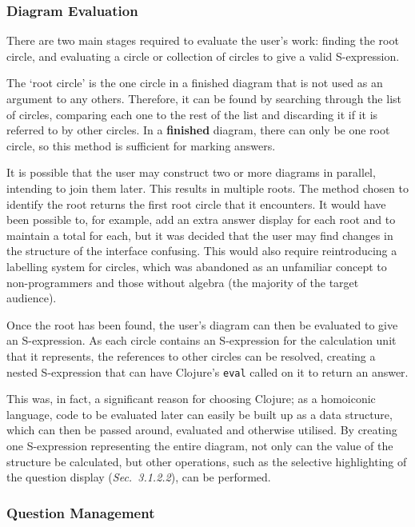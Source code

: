 \documentclass[12pt,twoside,notitlepage,xetex]{report}
\begin{document}
\subsubsection{Diagram Evaluation}

There are two main stages required to evaluate the user's work: finding the root circle, and evaluating a circle or collection of circles to give a valid S-expression.

The `root circle' is the one circle in a finished diagram that is not used as an argument to any others.  Therefore, it can be found by searching through the list of circles, comparing each one to the rest of the list and discarding it if it is referred to by other circles.  In a {\bf finished} diagram, there can only be one root circle, so this method is sufficient for marking answers.

It is possible that the user may construct two or more diagrams in parallel, intending to join them later.  This results in multiple roots.  The method chosen to identify the root returns the first root circle that it encounters.  It would have been possible to, for example, add an extra answer display for each root and to maintain a total for each, but it was decided that the user may find changes in the structure of the interface confusing.  This would also require reintroducing a labelling system for circles, which was abandoned as an unfamiliar concept to non-programmers and those without algebra (the majority of the target audience).

Once the root has been found, the user's diagram can then be evaluated to give an S-expression.  As each circle contains an S-expression for the calculation unit that it represents, the references to other circles can be resolved, creating a nested S-expression that can have Clojure's \verb¬eval¬ called on it to return an answer.

This was, in fact, a significant reason for choosing Clojure; as a homoiconic language, code to be evaluated later can easily be built up as a data structure, which can then be passed around, evaluated and otherwise utilised.  By creating one S-expression representing the entire diagram, not only can the value of the structure be calculated, but other operations, such as the selective highlighting of the question display (\emph{Sec.~3.1.2.2}), can be performed.

\subsubsection{Question Management}
\end{document}
